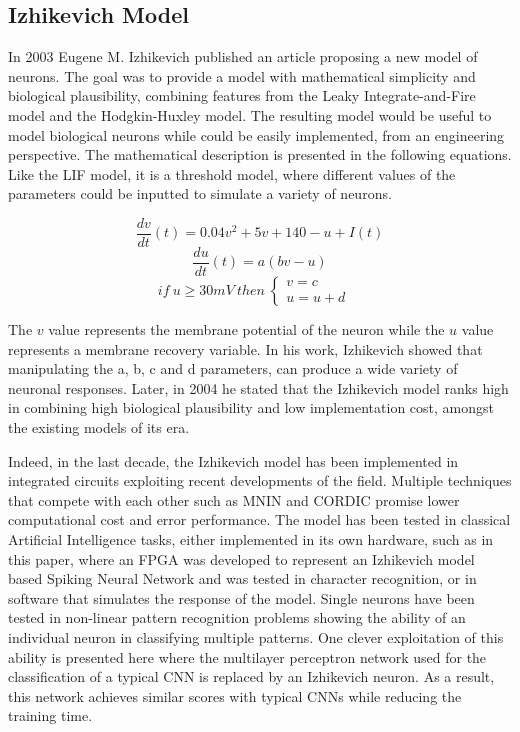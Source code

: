 \documentclass[12pt]{report}
\begin{document}
\medskip

\subsection{Izhikevich Model}

In 2003 Eugene M. Izhikevich published an article proposing a new model of neurons\cite{Izhikevich2003}. The goal was to provide a model with mathematical simplicity and biological plausibility, combining features from the Leaky Integrate-and-Fire model and the Hodgkin-Huxley model. The resulting model would be useful to model biological neurons while could be easily implemented, from an engineering perspective. The mathematical description is presented in the following equations. Like the LIF model, it is a threshold model, where different values of the parameters could be inputted to simulate a variety of neurons.

\begin{equation}
    \frac{dv}{dt}(t) = 0.04v^2+5v+140-u+I(t)
\end{equation}
\begin{equation}
\frac{du}{dt}(t) = a(bv-u)
\end{equation}
\begin{equation}
if \:u\geq30mV \: then \: \left\{
\begin{array}{ll}
     v = c &  \\
     u = u+d & 
\end{array}
\right.
\end{equation}

The \(v\) value represents the membrane potential of the neuron while the \(u\) value represents a membrane recovery variable. In his work, Izhikevich showed that manipulating the a, b, c and d parameters, can produce a wide variety of neuronal responses. Later, in 2004 he stated\cite{Izhikevich2004} that the Izhikevich model ranks high in combining high biological plausibility and low implementation cost, amongst the existing models of its era. 

Indeed, in the last decade, the Izhikevich model has been implemented in integrated circuits exploiting recent developments of the field. Multiple techniques that compete with each other such as MNIN\cite{Haghiri2018} and CORDIC\cite{Elnabawy2018} promise lower computational cost and error performance. The model has been tested in classical Artificial Intelligence tasks, either implemented in its own hardware, such as in this paper\cite{Rice2009}, where an FPGA was developed to represent an Izhikevich model based Spiking Neural Network and was tested in character recognition, or in software that simulates the response of the model. Single neurons have been tested in non-linear pattern recognition problems\cite{Antonio2010} showing the ability of an individual neuron in classifying multiple patterns. One clever exploitation of this ability is presented here\cite{luna-a2019} where the multilayer perceptron network used for the classification of a typical CNN is replaced by an Izhikevich neuron. As a result, this network achieves similar scores with typical CNNs while reducing the training time.
\end{document}

